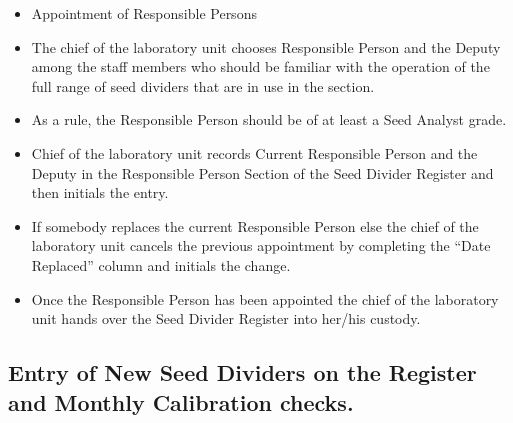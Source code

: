 \documentclass[]{book}
\providecommand{\tightlist}{%
  \setlength{\itemsep}{0pt}\setlength{\parskip}{0pt}}
\begin{document}
\begin{itemize}
\tightlist
\item
  Appointment of Responsible Persons
\item
  The chief of the laboratory unit chooses Responsible Person and the
  Deputy among the staff members who should be familiar with the
  operation of the full range of seed dividers that are in use in the
  section.
\item
  As a rule, the Responsible Person should be of at least a Seed Analyst
  grade.
\item
  Chief of the laboratory unit records Current Responsible Person and
  the Deputy in the Responsible Person Section of the Seed Divider
  Register and then initials the entry.
\item
  If somebody replaces the current Responsible Person else the chief of
  the laboratory unit cancels the previous appointment by completing the
  ``Date Replaced'' column and initials the change.
\item
  Once the Responsible Person has been appointed the chief of the
  laboratory unit hands over the Seed Divider Register into her/his
  custody.
\end{itemize}

\subsection{Entry of New Seed Dividers on the Register and Monthly
Calibration
checks.}\label{entry-of-new-seed-dividers-on-the-register-and-monthly-calibration-checks.}
\end{document}
